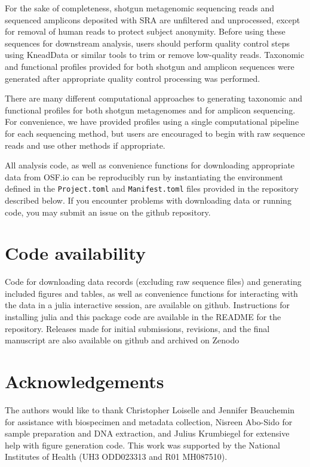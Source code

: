 \documentclass[fleqn,10pt]{wlscirep}
\begin{document}
For the sake of completeness, shotgun metagenomic sequencing reads and sequenced amplicons deposited with SRA
are unfiltered and unprocessed, except for removal of human reads to protect subject anonymity.
Before using these sequences for downstream analysis, users should perform quality control steps
using KneadData or similar tools to trim or remove low-quality reads.
Taxonomic and functional profiles provided for both shotgun and amplicon sequences
were generated after appropriate quality control processing was performed. 

There are many different computational approaches to generating taxonomic and functional profiles
for both shotgun metagenomes and for amplicon sequencing.
For convenience, we have provided profiles using a single computational pipeline for each sequencing method,
but users are encouraged to begin with raw sequence reads and use other methods if appropriate.

All analysis code, as well as convenience functions for downloading appropriate data from OSF.io
can be reproducibly run by instantiating the environment defined in the \verb|Project.toml| and \verb|Manifest.toml| files
provided in the repository described below.
If you encounter problems with downloading data or running code, you may submit an issue on the github repository.

\section*{Code availability}

Code for downloading data records (excluding raw sequence files) and generating included figures and tables,
as well as convenience functions for interacting with the data in a julia interactive session,
are available on github.
Instructions for installing julia and this package code are available in the README for the repository.
Releases made for initial submissions, revisions, and the final manuscript
are also available on github and archived on Zenodo \cite{Bonham2021-gl}



\section*{Acknowledgements}

The authors would like to thank Christopher Loiselle and Jennifer Beauchemin
for assistance with biospecimen and metadata collection,
Nisreen Abo-Sido for sample preparation and DNA extraction,
and Julius Krumbiegel for extensive help with figure generation code. 
This work was supported by the National Institutes of Health (UH3 ODD023313 and R01 MH087510). 
\end{document}
